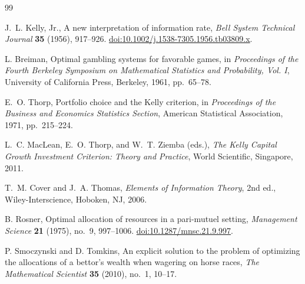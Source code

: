 \documentclass[11pt]{article}
\begin{document}
\begin{thebibliography}{99}

J.~L. Kelly, Jr.,
\newblock A new interpretation of information rate,
\newblock \emph{Bell System Technical Journal} \textbf{35} (1956), 917--926.
\newblock \href{https://doi.org/10.1002/j.1538-7305.1956.tb03809.x}{doi:10.1002/j.1538-7305.1956.tb03809.x}.

L. Breiman,
\newblock Optimal gambling systems for favorable games,
\newblock in \emph{Proceedings of the Fourth Berkeley Symposium on Mathematical Statistics and Probability, Vol. I}, University of California Press, Berkeley, 1961, pp.~65--78.

E.~O. Thorp,
\newblock Portfolio choice and the Kelly criterion,
\newblock in \emph{Proceedings of the Business and Economics Statistics Section}, American Statistical Association, 1971, pp.~215--224.

L.~C. MacLean, E.~O. Thorp, and W.~T. Ziemba (eds.),
\newblock \emph{The Kelly Capital Growth Investment Criterion: Theory and Practice},
\newblock World Scientific, Singapore, 2011.

T.~M. Cover and J.~A. Thomas,
\newblock \emph{Elements of Information Theory}, 2nd ed.,
\newblock Wiley-Interscience, Hoboken, NJ, 2006.

B. Rosner,
\newblock Optimal allocation of resources in a pari-mutuel setting,
\newblock \emph{Management Science} \textbf{21} (1975), no.~9, 997--1006.
\newblock \href{https://doi.org/10.1287/mnsc.21.9.997}{doi:10.1287/mnsc.21.9.997}.

P. Smoczynski and D. Tomkins,
\newblock An explicit solution to the problem of optimizing the allocations of a bettor's wealth when wagering on horse races,
\newblock \emph{The Mathematical Scientist} \textbf{35} (2010), no.~1, 10--17.

\end{thebibliography}
\end{document}
